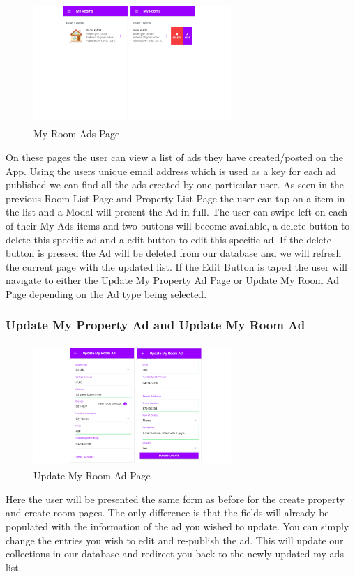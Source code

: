 \begin{figure}[h]
\centering
\includegraphics[width=7.5cm, height=4.6cm]{img/myAds}
\caption{My Room Ads Page}
\end{figure}  

On these pages the user can view a list of ads they have created/posted on the App. Using the users unique email address which is used as a key for each ad published we can find all the ads created by one particular user. As seen in the previous Room List Page and Property List Page the user can tap on a item in the list and a Modal will present the Ad in full. 
The user can swipe left on each of their My Ads items and two buttons will become available, a delete button to delete this specific ad and a edit button to edit this specific ad. If the delete button is pressed the Ad will be deleted from our database and we will refresh the current page with the updated list. If the Edit Button is taped the user will navigate to either the Update My Property Ad Page or Update My Room Ad Page depending on the Ad type being selected.

\subsubsection{Update My Property Ad and Update My Room Ad}

\begin{figure}[h]
\centering
\includegraphics[width=7.5cm, height=4.6cm]{img/update}
\caption{Update My Room Ad Page}
\end{figure}  

Here the user will be presented the same form as before for the create property and create room pages. The only difference is that the fields will already be populated with the information of the ad you wished to update. You can simply change the entries you wish to edit and re-publish the ad. This will update our collections in our database and redirect you back to the newly updated my ads list.









